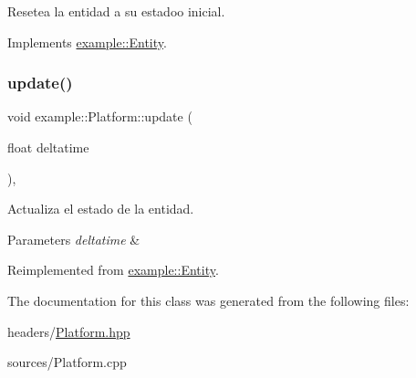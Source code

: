 Resetea la entidad a su estadoo inicial. 



Implements \mbox{\hyperlink{classexample_1_1_entity_a38eec21167e85013a5e89a9131458bfa}{example\+::\+Entity}}.

\mbox{\label{classexample_1_1_platform_a6e8de925951062be87fe836934b4a634}} 
\subsubsection{\texorpdfstring{update()}{update()}}
{\footnotesize\ttfamily void example\+::\+Platform\+::update (\begin{DoxyParamCaption}\item[{float}]{deltatime }\end{DoxyParamCaption})\hspace{0.3cm}{\ttfamily [override]}, {\ttfamily [virtual]}}



Actualiza el estado de la entidad. 


\begin{DoxyParams}{Parameters}
{\em deltatime} & \\
\hline
\end{DoxyParams}


Reimplemented from \mbox{\hyperlink{classexample_1_1_entity_a1f987399c6c2f5e83b2d245d81cc3b7e}{example\+::\+Entity}}.



The documentation for this class was generated from the following files\+:\begin{DoxyCompactItemize}
\item 
headers/\mbox{\hyperlink{_platform_8hpp}{Platform.\+hpp}}\item 
sources/Platform.\+cpp\end{DoxyCompactItemize}
